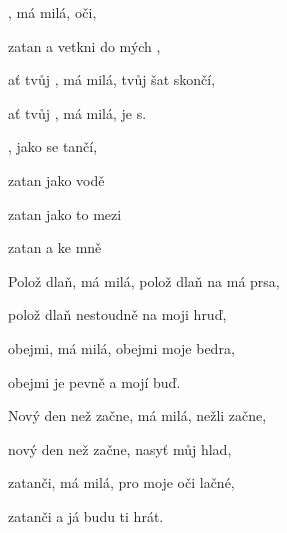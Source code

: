 

\zs
{}, má milá,   oči,

zatan a vetkni  do mých ,

ať tvůj , má milá,  tvůj šat  skončí,

ať tvůj , má milá,  je s.
\ks

\zr
{}, jako se   tančí,

zatan jako  vodě 

zatan jako to  mezi 

zatan a  ke mně 
\kr

\zs
Polož dlaň, má milá, polož dlaň na má prsa,

polož dlaň nestoudně na moji hruď,

obejmi, má milá, obejmi moje bedra,

obejmi je pevně a mojí buď.
\ks

\zr  \kr

\zs
Nový den než začne, má milá, nežli začne,

nový den než začne, nasyť můj hlad,

zatanči, má milá, pro moje oči lačné,

zatanči a já budu ti hrát.
\ks

\zr  \kr

\zr  \kr

\kp





